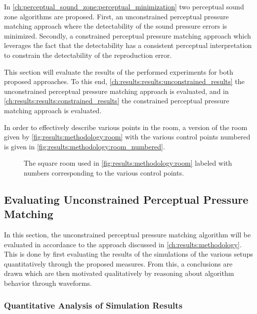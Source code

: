In \autoref{ch:perceptual_sound_zone:perceptual_minimization} two perceptual sound zone algorithms are proposed. 
First, an unconstrained perceptual pressure matching approach where the detectability of the sound pressure 
errors is minimized.
Secondly, a constrained perceptual pressure matching approach which leverages the fact that the 
detectability has a consistent 
perceptual interpretation to constrain the detectability of the reproduction error.

This section will evaluate the results of the performed experiments for both proposed approaches.
To this end, \autoref{ch:results:results:unconstrained_results} the unconstrained perceptual pressure 
matching approach is evaluated, and in  \autoref{ch:results:results:constrained_results} the constrained perceptual pressure 
matching approach is evaluated.

In order to effectively describe various points in the room, a version of the room 
given by \autoref{fig:results:methodology:room}
with the various control points numbered is given in \autoref{fig:results:methodology:room_numbered}.

\begin{figure}[]
    \centering
    \scalebox{1.0}{}
    \caption{The square room used in \autoref{fig:results:methodology:room} labeled with numbers corresponding to 
    the various control points.}
    \label{fig:results:methodology:room_numbered}
\end{figure}


\subsection{Evaluating Unconstrained Perceptual Pressure Matching}
\label{ch:results:results:unconstrained_results}
In this section, the unconstrained perceptual pressure matching algorithm will be evaluated in accordance to the 
approach discussed in \autoref{ch:results:methodology}.
This is done by first evaluating the results of the simulations of the various setups 
quantitatively through the proposed measures.
From this, a conclusions are drawn which are then motivated qualitatively by reasoning about algorithm behavior through
waveforms.

\subsubsection*{Quantitative Analysis of Simulation Results}

